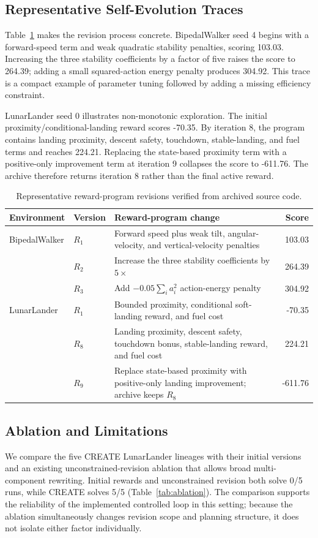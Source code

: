 \subsection{Representative Self-Evolution Traces}
Table~\ref{tab:cases} makes the revision process concrete. BipedalWalker seed 4 begins with a forward-speed term and weak quadratic stability penalties, scoring 103.03. Increasing the three stability coefficients by a factor of five raises the score to 264.39; adding a small squared-action energy penalty produces 304.92. This trace is a compact example of parameter tuning followed by adding a missing efficiency constraint.

LunarLander seed 0 illustrates non-monotonic exploration. The initial proximity/conditional-landing reward scores -70.35. By iteration 8, the program contains landing proximity, descent safety, touchdown, stable-landing, and fuel terms and reaches 224.21. Replacing the state-based proximity term with a positive-only improvement term at iteration 9 collapses the score to -611.76. The archive therefore returns iteration 8 rather than the final active reward.

\begin{table}[t]
\caption{Representative reward-program revisions verified from archived source code.}
\label{tab:cases}
\centering
\scriptsize
\setlength{\tabcolsep}{3.8pt}
\begin{tabular}{llp{10.2cm}r}
\toprule
Environment & Version & Reward-program change & Score \\
\midrule
BipedalWalker & $R_1$ & Forward speed plus weak tilt, angular-velocity, and vertical-velocity penalties & 103.03 \\
 & $R_2$ & Increase the three stability coefficients by $5\times$ & 264.39 \\
 & $R_3$ & Add $-0.05\sum_i a_i^2$ action-energy penalty & 304.92 \\
\midrule
LunarLander & $R_1$ & Bounded proximity, conditional soft-landing reward, and fuel cost & -70.35 \\
 & $R_8$ & Landing proximity, descent safety, touchdown bonus, stable-landing reward, and fuel cost & 224.21 \\
 & $R_9$ & Replace state-based proximity with positive-only landing improvement; archive keeps $R_8$ & -611.76 \\
\bottomrule
\end{tabular}
\end{table}

\subsection{Ablation and Limitations}
We compare the five CREATE LunarLander lineages with their initial versions and an existing unconstrained-revision ablation that allows broad multi-component rewriting. Initial rewards and unconstrained revision both solve 0/5 runs, while CREATE solves 5/5 (Table~\ref{tab:ablation}). The comparison supports the reliability of the implemented controlled loop in this setting; because the ablation simultaneously changes revision scope and planning structure, it does not isolate either factor individually.

